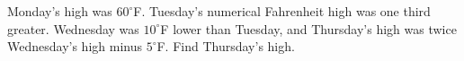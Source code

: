 Monday's high was $60^\circ$F. Tuesday's numerical Fahrenheit high was one third greater. Wednesday was $10^\circ$F lower than Tuesday, and Thursday's high was twice Wednesday's high minus $5^\circ$F. Find Thursday's high.
